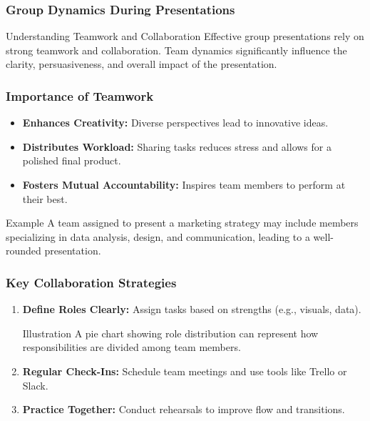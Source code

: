 \documentclass[aspectratio=169]{beamer}
\begin{document}
\begin{frame}[fragile]
    \frametitle{Group Dynamics During Presentations}
    \begin{block}{Understanding Teamwork and Collaboration}
        Effective group presentations rely on strong teamwork and collaboration. 
        Team dynamics significantly influence the clarity, persuasiveness, and overall impact of the presentation.
    \end{block}
\end{frame}

\begin{frame}[fragile]
    \frametitle{Importance of Teamwork}
    \begin{itemize}
        \item \textbf{Enhances Creativity:} Diverse perspectives lead to innovative ideas.
        \item \textbf{Distributes Workload:} Sharing tasks reduces stress and allows for a polished final product.
        \item \textbf{Fosters Mutual Accountability:} Inspires team members to perform at their best.
    \end{itemize}
    \begin{block}{Example}
        A team assigned to present a marketing strategy may include members specializing in data analysis, design, and communication, leading to a well-rounded presentation.
    \end{block}
\end{frame}

\begin{frame}[fragile]
    \frametitle{Key Collaboration Strategies}
    \begin{enumerate}
        \item \textbf{Define Roles Clearly:} Assign tasks based on strengths (e.g., visuals, data).
            \begin{block}{Illustration}
                A pie chart showing role distribution can represent how responsibilities are divided among team members.
            \end{block}
        \item \textbf{Regular Check-Ins:} Schedule team meetings and use tools like Trello or Slack.
        \item \textbf{Practice Together:} Conduct rehearsals to improve flow and transitions.
    \end{enumerate}
\end{frame}
\end{document}
